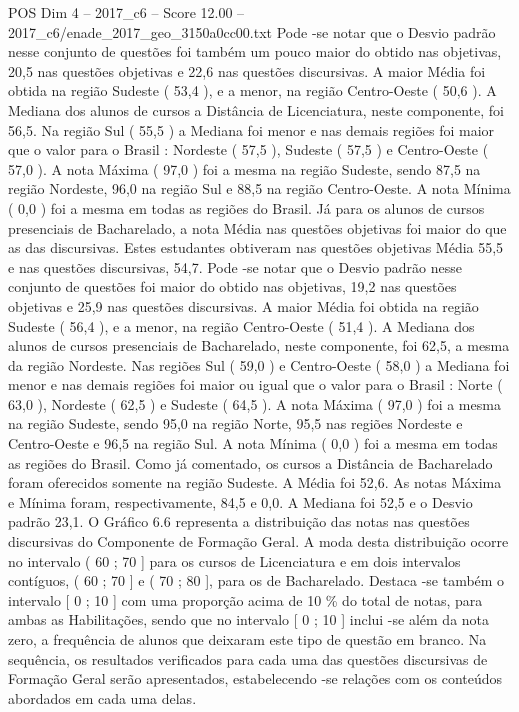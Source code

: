 \begin{textsample}{POS Dim 4 – 2017\_c6 – Score 12.00 – 2017\_c6/enade\_2017\_geo\_3150a0cc00.txt}
Pode -se notar que o Desvio padrão nesse conjunto de questões foi também um pouco maior do obtido nas objetivas, 20,5 nas questões objetivas e 22,6 nas questões discursivas.
A maior Média foi obtida na região Sudeste ( 53,4 ), e a menor, na região Centro-Oeste ( 50,6 ).
A Mediana dos alunos de cursos a Distância de Licenciatura, neste componente, foi 56,5.
Na região Sul ( 55,5 ) a Mediana foi menor e nas demais regiões foi maior que o valor para o Brasil : Nordeste ( 57,5 ), Sudeste ( 57,5 ) e Centro-Oeste ( 57,0 ).
A nota Máxima ( 97,0 ) foi a mesma na região Sudeste, sendo 87,5 na região Nordeste, 96,0 na região Sul e 88,5 na região Centro-Oeste.
A nota Mínima ( 0,0 ) foi a mesma em todas as regiões do Brasil.
Já para os alunos de cursos presenciais de Bacharelado, a nota Média nas questões objetivas foi maior do que as das discursivas.
Estes estudantes obtiveram nas questões objetivas Média 55,5 e nas questões discursivas, 54,7.
Pode -se notar que o Desvio padrão nesse conjunto de questões foi maior do obtido nas objetivas, 19,2 nas questões objetivas e 25,9 nas questões discursivas.
A maior Média foi obtida na região Sudeste ( 56,4 ), e a menor, na região Centro-Oeste ( 51,4 ).
A Mediana dos alunos de cursos presenciais de Bacharelado, neste componente, foi 62,5, a mesma da região Nordeste.
Nas regiões Sul ( 59,0 ) e Centro-Oeste ( 58,0 ) a Mediana foi menor e nas demais regiões foi maior ou igual que o valor para o Brasil : Norte ( 63,0 ), Nordeste ( 62,5 ) e Sudeste ( 64,5 ).
A nota Máxima ( 97,0 ) foi a mesma na região Sudeste, sendo 95,0 na região Norte, 95,5 nas regiões Nordeste e Centro-Oeste e 96,5 na região Sul.
A nota Mínima ( 0,0 ) foi a mesma em todas as regiões do Brasil.
Como já comentado, os cursos a Distância de Bacharelado foram oferecidos somente na região Sudeste.
A Média foi 52,6.
As notas Máxima e Mínima foram, respectivamente, 84,5 e 0,0.
A Mediana foi 52,5 e o Desvio padrão 23,1.
O Gráfico 6.6 representa a distribuição das notas nas questões discursivas do Componente de Formação Geral.
A moda desta distribuição ocorre no intervalo ( 60 ; 70 ] para os cursos de Licenciatura e em dois intervalos contíguos, ( 60 ; 70 ] e ( 70 ; 80 ], para os de Bacharelado.
Destaca -se também o intervalo [ 0 ; 10 ] com uma proporção acima de 10 \% do total de notas, para ambas as Habilitações, sendo que no intervalo [ 0 ; 10 ] inclui -se além da nota zero, a frequência de alunos que deixaram este tipo de questão em branco.
Na sequência, os resultados verificados para cada uma das questões discursivas de Formação Geral serão apresentados, estabelecendo -se relações com os conteúdos abordados em cada uma delas.

\end{textsample}
